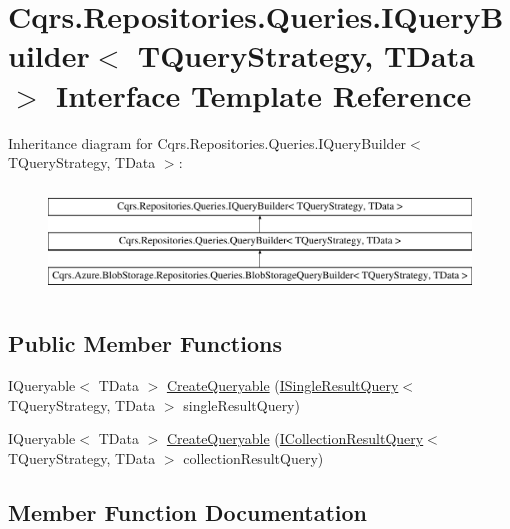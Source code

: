 \hypertarget{interfaceCqrs_1_1Repositories_1_1Queries_1_1IQueryBuilder}{}\section{Cqrs.\+Repositories.\+Queries.\+I\+Query\+Builder$<$ T\+Query\+Strategy, T\+Data $>$ Interface Template Reference}
\label{interfaceCqrs_1_1Repositories_1_1Queries_1_1IQueryBuilder}
Inheritance diagram for Cqrs.\+Repositories.\+Queries.\+I\+Query\+Builder$<$ T\+Query\+Strategy, T\+Data $>$\+:\begin{figure}[H]
\begin{center}
\leavevmode
\includegraphics[height=2.876712cm]{interfaceCqrs_1_1Repositories_1_1Queries_1_1IQueryBuilder}
\end{center}
\end{figure}
\subsection*{Public Member Functions}
\begin{DoxyCompactItemize}
\item 
I\+Queryable$<$ T\+Data $>$ \hyperlink{interfaceCqrs_1_1Repositories_1_1Queries_1_1IQueryBuilder_a83cb87d485491c6d38fe8fa6fd649373_a83cb87d485491c6d38fe8fa6fd649373}{Create\+Queryable} (\hyperlink{interfaceCqrs_1_1Repositories_1_1Queries_1_1ISingleResultQuery}{I\+Single\+Result\+Query}$<$ T\+Query\+Strategy, T\+Data $>$ single\+Result\+Query)
\item 
I\+Queryable$<$ T\+Data $>$ \hyperlink{interfaceCqrs_1_1Repositories_1_1Queries_1_1IQueryBuilder_ab903955b6fb1843a3e168b33252161a5_ab903955b6fb1843a3e168b33252161a5}{Create\+Queryable} (\hyperlink{interfaceCqrs_1_1Repositories_1_1Queries_1_1ICollectionResultQuery}{I\+Collection\+Result\+Query}$<$ T\+Query\+Strategy, T\+Data $>$ collection\+Result\+Query)
\end{DoxyCompactItemize}


\subsection{Member Function Documentation}
\mbox{\label{interfaceCqrs_1_1Repositories_1_1Queries_1_1IQueryBuilder_a83cb87d485491c6d38fe8fa6fd649373_a83cb87d485491c6d38fe8fa6fd649373}} 
